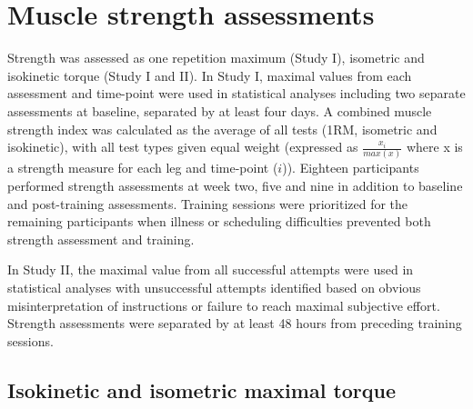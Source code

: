 \documentclass[twoside,10pt]{gihclass} %
\begin{document}
\hypertarget{muscle-strength-assessments}{%
\section{Muscle strength assessments}\label{muscle-strength-assessments}}

Strength was assessed as one repetition maximum (Study I), isometric and isokinetic torque (Study I and II). In Study I, maximal values from each assessment and time-point were used in statistical analyses including two separate assessments at baseline, separated by at least four days. A combined muscle strength index was calculated as the average of all tests (1RM, isometric and isokinetic), with all test types given equal weight (expressed as \(\frac{x_i}{max(x)}\) where x is a strength measure for each leg and time-point (\(i\))). Eighteen participants performed strength assessments at week two, five and nine in addition to baseline and post-training assessments. Training sessions were prioritized for the remaining participants when illness or scheduling difficulties prevented both strength assessment and training.

In Study II, the maximal value from all successful attempts were used in statistical analyses with unsuccessful attempts identified based on obvious misinterpretation of instructions or failure to reach maximal subjective effort. Strength assessments were separated by at least 48 hours from preceding training sessions.

\hypertarget{isokinetic-and-isometric-maximal-torque}{%
\subsection{Isokinetic and isometric maximal torque}\label{isokinetic-and-isometric-maximal-torque}}
\end{document}
